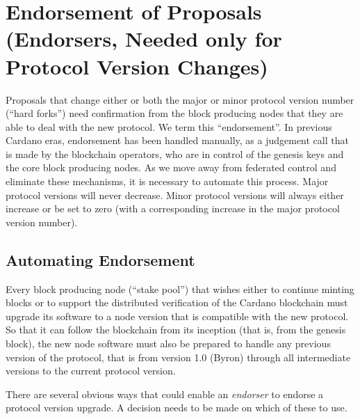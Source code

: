 \newpage
\section{Endorsement of Proposals (Endorsers, Needed only for Protocol Version Changes)}
\label{sect:endorsement}

Proposals that change either or both the major or minor protocol version number (``hard forks'') need confirmation from the block producing nodes that they are able
to deal with the new protocol.  We term this ``endorsement''.   In previous Cardano eras, endorsement has been handled manually, as a judgement call that
is made by the blockchain operators, who are in control of the genesis keys and the core block producing nodes.  As we move away from federated control and eliminate these
mechanisms, it is necessary to automate this process.  Major protocol versions will never decrease.  Minor protocol versions will always either increase or be set to zero
(with a corresponding increase in the major protocol version number).

\subsection{Automating Endorsement}

Every block producing node (``stake pool'') that wishes either to continue minting
blocks or to support the distributed verification of the Cardano blockchain must upgrade its
software to a node version that is compatible with the new protocol.  So that it
can follow the blockchain from its inception (that is, from the genesis block),
the new node software must also be prepared to handle any previous version of
the protocol, that is from version 1.0 (Byron) through all intermediate versions to the current protocol version.

There are several obvious ways that could enable an \emph{endorser} to endorse a protocol version upgrade.  A decision needs
to be made on which of these to use.

